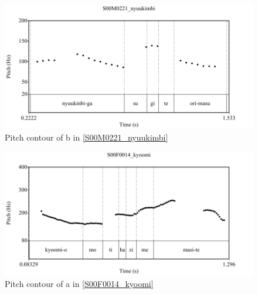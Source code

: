 \begin{figure}
	\begin{center}
	\includegraphics[width=.5\textwidth]{sounds/S00M0221_nyuukimbi.pdf}
	\caption{Pitch contour of b in \ref{S00M0221_nyuukimbi}}
	\label{S00M0221_nyuukimbiF}
	\end{center}
\end{figure}
\begin{figure}
	\begin{center}
	\includegraphics[width=.5\textwidth]{sounds/S00F0014_kyoomi.pdf}
	\caption{Pitch contour of a in \ref{S00F0014_kyoomi}}
	\label{S00F0014_kyoomiF}
	\end{center}
\end{figure}











